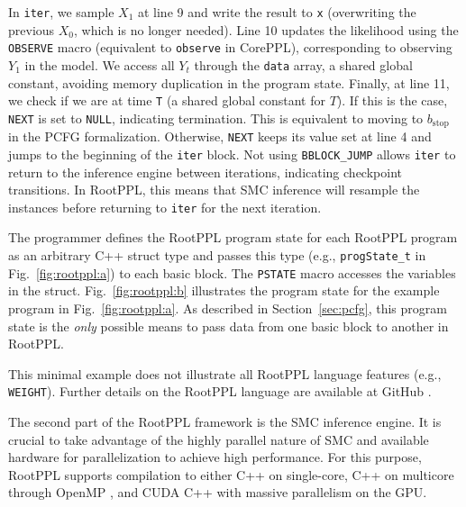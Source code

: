 \documentclass[runningheads]{llncs}
\newcommand{\rlstinline}{\lstinline[language=RootPPL]}
\newcommand{\clstinline}{\lstinline[language=CorePPL]}
\begin{document}
In \lstinline!iter!, we sample $X_1$ at line 9 and write the result to \lstinline!x! (overwriting the previous $X_0$, which is no longer needed).
Line 10 updates the likelihood using the \rlstinline!OBSERVE! macro (equivalent to \clstinline!observe! in CorePPL), corresponding to observing $Y_1$ in the model.
We access all $Y_t$ through the \lstinline!data! array, a shared global constant, avoiding memory duplication in the program state.
Finally, at line 11, we check if we are at time \lstinline!T! (a shared global constant for $T$).
If this is the case, \rlstinline!NEXT! is set to \lstinline!NULL!, indicating termination.
This is equivalent to moving to $b_\text{stop}$ in the PCFG formalization.
Otherwise, \rlstinline!NEXT! keeps its value set at line 4 and jumps to the beginning of the \lstinline!iter! block.
Not using \rlstinline!BBLOCK_JUMP! allows \lstinline!iter! to return to the inference engine between iterations, indicating checkpoint transitions.
In RootPPL, this means that SMC inference will resample the instances before returning to \lstinline!iter! for the next iteration.

The programmer defines the RootPPL program state for each RootPPL program as an arbitrary C++ struct type and passes
this type (e.g., \rlstinline!progState_t! in Fig.~\ref{fig:rootppl:a}) to each basic block.
The \rlstinline!PSTATE! macro accesses the variables in the struct.
Fig.~\ref{fig:rootppl:b} illustrates the program state for the example program in Fig.~\ref{fig:rootppl:a}.
As described in Section~\ref{sec:pcfg}, this program state is the \emph{only} possible means to pass data from one basic block to another in RootPPL.

This minimal example does not illustrate all RootPPL language features (e.g., \rlstinline!WEIGHT!).
Further details on the RootPPL language are available at GitHub \cite{mikingdppl2021}.

The second part of the RootPPL framework is the SMC inference engine.
It is crucial to take advantage of the highly parallel nature of SMC and available hardware for parallelization to achieve high performance.
For this purpose, RootPPL supports compilation to either C++ on single-core, C++ on multicore through OpenMP \cite{openmp2021}, and CUDA C++ \cite{cuda2021} with massive parallelism on the GPU.
\end{document}
